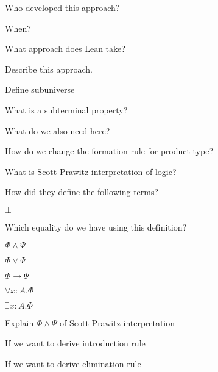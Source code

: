 \documentclass[fleqn]{article}
\begin{document}
\begin{enumerate}
\begin{itemize}
    \end{itemize}
    {\color{red}\item Who developed this approach?}
    {\color{red}\item When?}
    {\color{red}\item What approach does Lean take?}
    {\color{green}\item Describe this approach.}
    {\color{red}\item Define subuniverse}
    {\color{green}\item What is a subterminal property?}
    {\color{blue}\item What do we also need here?}
    {\color{red}\item How do we change the formation rule for product type?}
    {\color{green}\item What is Scott-Prawitz interpretation of logic?}
    \item How did they define the following terms?
    \begin{itemize}
        {\color{blue}\item $\bot$}
        {\color{green}\item Which equality do we have using this definition?}
        {\color{blue}\item $\Phi \wedge \Psi$}
        {\color{red}\item $\Phi \vee \Psi$}
        \item $\Phi \rightarrow \Psi$
        {\color{red}\item $\forall x : A. \Phi$}
        {\color{green}\item $\exists x: A. \Phi$}
    \end{itemize}
    \item Explain $\Phi \wedge \Psi$ of Scott-Prawitz interpretation
    \begin{itemize}
        {\color{blue}\item If we want to derive introduction rule}
        {\color{blue}\item If we want to derive elimination rule }
    \end{itemize}    
\end{enumerate}
\end{document}
